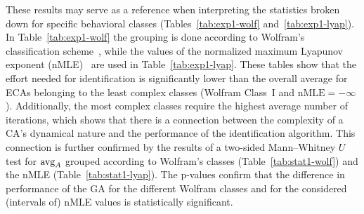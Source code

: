 These results may serve as a reference when interpreting the statistics broken down for specific behavioral classes (Tables~\ref{tab:exp1-wolf} and~\ref{tab:exp1-lyap}). In Table~\ref{tab:exp1-wolf} the grouping is done according to Wolfram's classification scheme~\cite{RevModPhys.55.601}, while the values of the normalized maximum Lyapunov exponent (nMLE)~\cite{Wolfram:84,Sher:92,citeulike:9312129} are used in Table~\ref{tab:exp1-lyap}. These tables show that the effort needed for identification is significantly lower than the overall average for ECAs belonging to the least complex classes (Wolfram Class~I and $\textrm{nMLE}=-\infty$). Additionally, the most complex classes require the highest average number of iterations, which shows that there is a connection between the complexity of a CA's dynamical nature and the performance of the identification algorithm. This connection is further confirmed by the results of a two-sided Mann--Whitney $U$ test for $\operatorname{avg}_A$ grouped according to Wolfram's classes (Table~\ref{tab:stat1-wolf}) and the nMLE  (Table~\ref{tab:stat1-lyap}). The p-values confirm that the difference in performance of the GA for the different Wolfram classes and for the considered (intervals of) nMLE values is statistically significant.
\begin{table}[ht]
	\centering
	\caption{Experiment 1: The performance of the GA expressed in terms of the average of the minimum, average and maximum number of iterations per behavioral class according to Wolfram's classification scheme \protect{} and the nMLE~\protect{}.}
	\quad
\end{table}

